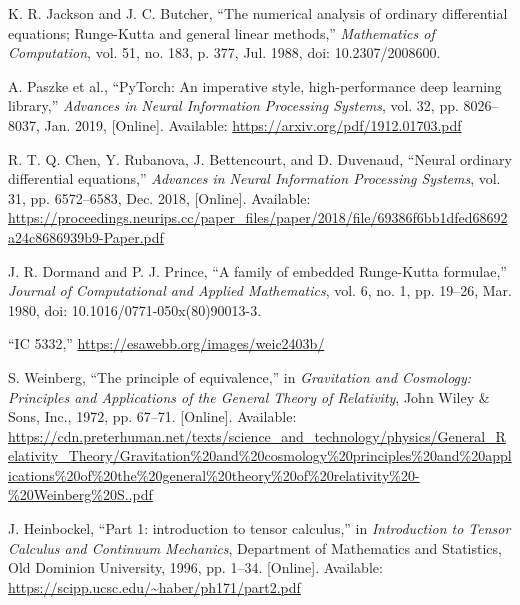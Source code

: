 \documentclass[conference]{IEEEtran}
\begin{document}
\begin{thebibliography}{00}
K. R. Jackson and J. C. Butcher, ``The numerical analysis of ordinary differential equations; Runge-Kutta and general linear methods,'' \textit{Mathematics of Computation}, vol. 51, no. 183, p. 377, Jul. 1988, doi: 10.2307/2008600.

A. Paszke et al., ``PyTorch: An imperative style, high-performance deep learning library,'' \textit{Advances in Neural Information Processing Systems}, vol. 32, pp. 8026--8037, Jan. 2019, [Online]. Available: \url{https://arxiv.org/pdf/1912.01703.pdf}

R. T. Q. Chen, Y. Rubanova, J. Bettencourt, and D. Duvenaud, ``Neural ordinary differential equations,'' \textit{Advances in Neural Information Processing Systems}, vol. 31, pp. 6572--6583, Dec. 2018, [Online]. Available: \url{https://proceedings.neurips.cc/paper_files/paper/2018/file/69386f6bb1dfed68692a24c8686939b9-Paper.pdf}

J. R. Dormand and P. J. Prince, ``A family of embedded Runge-Kutta formulae,'' \textit{Journal of Computational and Applied Mathematics}, vol. 6, no. 1, pp. 19--26, Mar. 1980, doi: 10.1016/0771-050x(80)90013-3.

``IC 5332,'' \url{https://esawebb.org/images/weic2403b/}

S. Weinberg, ``The principle of equivalence,'' in \textit{Gravitation and Cosmology: Principles and Applications of the General Theory of Relativity}, John Wiley \& Sons, Inc., 1972, pp. 67--71. [Online]. Available: \url{https://cdn.preterhuman.net/texts/science_and_technology/physics/General_Relativity_Theory/Gravitation%20and%20cosmology%20principles%20and%20applications%20of%20the%20general%20theory%20of%20relativity%20-%20Weinberg%20S..pdf}

J. Heinbockel, ``Part 1: introduction to tensor calculus,'' in \textit{Introduction to Tensor Calculus and Continuum Mechanics}, Department of Mathematics and Statistics, Old Dominion University, 1996, pp. 1--34. [Online]. Available: \url{https://scipp.ucsc.edu/~haber/ph171/part2.pdf}
\end{thebibliography}
\vspace{12pt}
\end{document}
